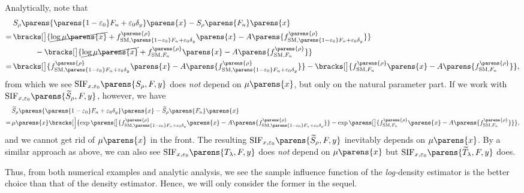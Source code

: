 Analytically, note that 
\begin{align*}
	& \, S_{\rho} \parens{ \parens{1 - \varepsilon_0} F_n + \varepsilon_0 \delta_y } \parens{x} - S_{\rho} \parens{F_n} \parens{x} \\ 
	= & \, \bracks[\big]{ \cancel{\log \mu \parens{x}} + f_{\SM, \parens{1 - \varepsilon_0} F_n + \varepsilon_0 \delta_y}^{\parens{\rho}} \parens{x} - A \parens{f_{\SM, \parens{1 - \varepsilon_0} F_n + \varepsilon_0 \delta_y}^{\parens{\rho}} } } \\ 
	& \qquad \quad - \bracks[\big]{ \cancel{\log \mu \parens{x}} + f_{\SM, F_n}^{\parens{\rho}} \parens{x} - A \parens{f_{\SM, F_n}^{\parens{\rho}} } } \\
	= & \, \bracks[\big]{ f_{\SM, \parens{1 - \varepsilon_0} F_n + \varepsilon_0 \delta_y}^{\parens{\rho}} \parens{x} - A \parens{f_{\SM, \parens{1 - \varepsilon_0} F_n + \varepsilon_0 \delta_y}^{\parens{\rho}} } } - \bracks[\big]{ f_{\SM, F_n}^{\parens{\rho}} \parens{x} - A \parens{f_{\SM, F_n}^{\parens{\rho}} } }, 
\end{align*}
from which we see $\mathrm{SIF}_{x, \varepsilon_0} \parens{S_{\rho}, F, y}$ does \textit{not} depend on $\mu \parens{x}$, but only on the natural parameter part. If we work with $\mathrm{SIF}_{x, \varepsilon_0} \parens{\widetilde{S}_{\rho}, F, y}$, however, we have 
\begin{align*}
	& \, \widetilde{S}_{\rho} \parens{ \parens{1 - \varepsilon_0} F_n + \varepsilon_0 \delta_y } \parens{x} - \widetilde{S}_{\rho} \parens{F_n} \parens{x} \\ 
	= & \, \mu \parens{x} \bracks[\Big]{\exp \parens[\big]{f_{\SM, \parens{1 - \varepsilon_0} F_n + \varepsilon_0 \delta_y}^{\parens{\rho}} \parens{x} - A \parens{f_{ \SM, \parens{1 - \varepsilon_0} F_n + \varepsilon_0 \delta_y}^{\parens{\rho}}}} - \exp \parens[\big]{f_{\SM, F_n}^{\parens{\rho}} \parens{x} - A \parens{f_{\SM, F_n }^{\parens{\rho}}}} }, 
\end{align*}
and we cannot get rid of $\mu \parens{x}$ in the front. The resulting $\mathrm{SIF}_{x, \varepsilon_0} \parens{\widetilde{S}_{\rho}, F, y}$ inevitably depends on $\mu \parens{x}$. By a similar approach as above, we can also see $\mathrm{SIF}_{x, \varepsilon_0} \parens{T_{\lambda}, F, y}$ does \textit{not} depend on $\mu \parens{x}$ but $\mathrm{SIF}_{x, \varepsilon_0} \parens{\widetilde{T}_{\lambda}, F, y}$ does. 

Thus, from both numerical examples and analytic analysis, we see the sample influence function of the \emph{log-}density estimator is the better choice than that of the density estimator. Hence, we will only consider the former in the sequel. 


